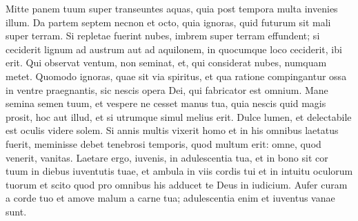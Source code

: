 \begin{biblechapter}
\begin{biblechapter}
\begin{biblechapter}
\begin{biblechapter}
\begin{biblechapter}
\begin{biblechapter}
\begin{biblechapter}
\begin{biblechapter}
\begin{biblechapter}
\begin{biblechapter}
\begin{biblechapter}
\verse Mitte panem tuum super transeuntes aquas, quia post tempora multa invenies illum.
 \verse Da partem septem necnon et octo, quia ignoras, quid futurum sit mali super terram.
 \verse Si repletae fuerint nubes,
 imbrem super terram effundent;
 si ceciderit lignum ad austrum aut ad aquilonem,
 in quocumque loco ceciderit, ibi erit. 
\verse Qui observat ventum, non seminat, et, qui considerat nubes, numquam metet.
 \verse Quomodo ignoras, quae sit via spiritus, et qua ratione compingantur ossa in ventre praegnantis, sic nescis opera Dei, qui fabricator est omnium.
 \verse Mane semina semen tuum,
 et vespere ne cesset manus tua,
 quia nescis quid magis prosit,
 hoc aut illud,
 et si utrumque simul melius erit.
 \verse Dulce lumen,
 et delectabile est oculis videre solem.
 \verse Si annis multis vixerit homo
 et in his omnibus laetatus fuerit,
 meminisse debet tenebrosi temporis, quod multum erit:
 omne, quod venerit, vanitas.
 \verse Laetare ergo, iuvenis, in adulescentia tua,
 et in bono sit cor tuum in diebus iuventutis tuae,
 et ambula in viis cordis tui
 et in intuitu oculorum tuorum
 et scito quod pro omnibus his
 adducet te Deus in iudicium.
 \verse Aufer curam a corde tuo
 et amove malum a carne tua;
 adulescentia enim et iuventus vanae sunt.
 

\end{biblechapter}
\end{biblechapter}
\end{biblechapter}
\end{biblechapter}
\end{biblechapter}
\end{biblechapter}
\end{biblechapter}
\end{biblechapter}
\end{biblechapter}
\end{biblechapter}
\end{biblechapter}
